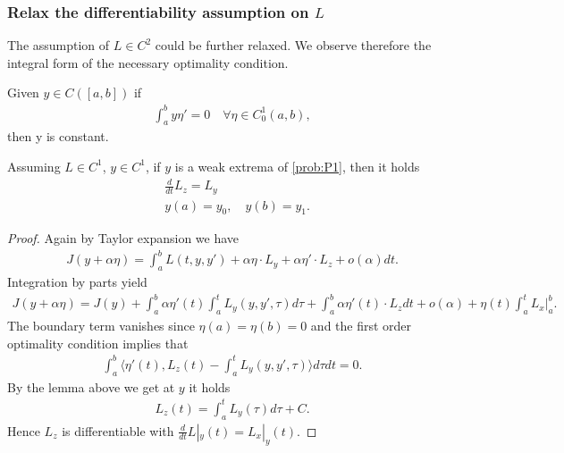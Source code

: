 \begin{example}
\end{example}


\subsubsection{Relax the differentiability assumption on $L$}
The assumption of $L \in C^2$ could be further relaxed. We observe therefore the integral form of the necessary optimality condition.

\begin{lemma}
	Given $y \in C([a, b])$ if 
	\begin{align*}
		\int_a^b y \eta' = 0 \quad \forall \eta \in C_0^1(a, b),
	\end{align*}
	then y is constant.
\end{lemma}

\begin{theorem}
	Assuming $L \in C^1$, $y \in C^1$, if $y$ is a weak extrema of \eqref{prob:P1}, then it holds
	\begin{align*}
		& \frac{d}{dt}L_z = L_y\\
		& y(a) = y_0, \quad y(b) = y_1. 
	\end{align*}
\end{theorem}
\begin{proof}
	Again by Taylor expansion we have
	\begin{align*}
		J(y + \alpha \eta) = \int_a^b L(t, y, y') + \alpha \eta \cdot L_y + \alpha \eta' \cdot L_z + o(\alpha) dt. 
	\end{align*}
	Integration by parts yield
	\begin{align*}
		J(y + \alpha\eta) = J(y) + \int_a^b \alpha \eta'(t) \int_a^t L_y(y, y', \tau) d\tau  + \int_a^b \alpha \eta'(t) \cdot L_z dt + o(\alpha) + \eta(t) \int_a^t L_x\bigg|_a^b.
	\end{align*}
	The boundary term vanishes since $\eta(a) = \eta(b) = 0$ and the first order optimality condition implies that 
	\begin{align*}
		 \int_a^b \langle \eta'(t),  L_z(t)  - \int_a^t L_y(y, y', \tau) \rangle   d\tau dt = 0.
	\end{align*}
	By the lemma above we get at $y$ it holds
	\begin{align*}
		L_z(t) = \int_a^t L_y(\tau) d\tau + C. 
	\end{align*}
	Hence $L_z$ is differentiable with $\frac{d}{dt}L|_y(t) = L_x|_y(t)$. 
\end{proof}




